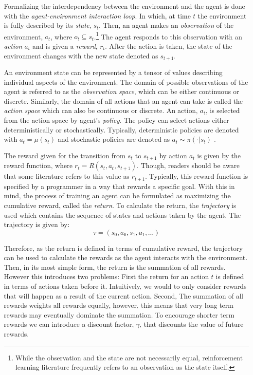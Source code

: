 \documentclass[conference]{IEEEtran}
\begin{document}
Formalizing the interdependency between the environment and the agent is done with the \textit{agent-environment interaction loop}. In which, at time $t$ the environment is fully described by its \textit{state}, $s_t$. Then, an agent makes an \textit{observation} of the environment, $o_t$, where $o_t \subseteq s_t$.\footnote{While the observation and the state are not necessarily equal, reinforcement learning literature frequently refers to an observation as the state itself.} The agent responds to this observation with an \textit{action} $a_t$ and is given a \textit{reward}, $r_t$. After the action is taken, the state of the environment changes with the new state denoted as $s_{t+1}$.

An environment state can be represented by a tensor of values describing individual aspects of the environment. The domain of possible observations of the agent is referred to as the \textit{observation space}, which can be either continuous or discrete. Similarly, the domain of all actions that an agent can take is called the \textit{action space} which can also be continuous or discrete. An action, $a_t$, is selected from the action space by agent's \textit{policy}. The policy can select actions either deterministically or stochastically. Typically, deterministic policies are denoted with $a_t = \mu(s_t)$ and stochastic policies are denoted as $a_t \sim \pi(\cdot | s_t)$ \cite{spinning_up_intro}.



The reward given for the transition from $s_t$ to $s_{t+1}$ by action $a_t$ is given by the reward function, where $r_t = R(s_t, a_t, s_{t+1})$. Though, readers should be aware that some literature refers to this value as $r_{t+1}$. Typically, this reward function is specified by a programmer in a way that rewards a specific goal. With this in mind, the process of training an agent can be formulated as maximizing the cumulative reward, called the \textit{return}. To calculate the return, the \textit{trajectory} is used which contains the sequence of states and actions taken by the agent. The trajectory is given by:
$$
    \tau = (s_0, a_0, s_1, a_1, ...)
$$

Therefore, as the return is defined in terms of cumulative reward, the trajectory can be used to calculate the rewards as the agent interacts with the environment. Then, in its most simple form, the return is the summation of all rewards. However this introduces two problems: First the return for an action $t$ is defined in terms of actions taken before it. Intuitively, we would to only consider rewards that will happen as a result of the current action. Second, The summation of all rewards weights all rewards equally, however, this means that very long term rewards may eventually dominate the summation. To encourage shorter term rewards we can introduce a discount factor, $\gamma$, that discounts the value of future rewards.
\end{document}
